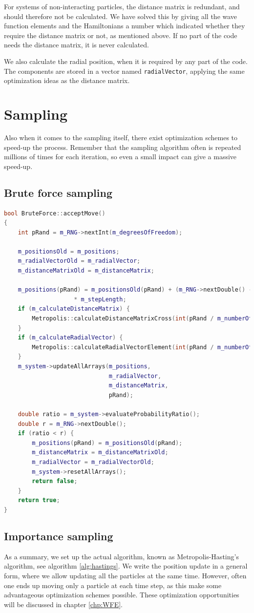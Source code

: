For systems of non-interacting particles, the distance matrix is redundant, and should therefore not be calculated. We have solved this by giving all the wave function elements and the Hamiltonians a number which indicated whether they require the distance matrix or not, as mentioned above. If no part of the code needs the distance matrix, it is never calculated. 

We also calculate the radial position, when it is required by any part of the code. The components are stored in a vector named \lstinline{radialVector}, applying the same optimization ideas as the distance matrix. 

\section{Sampling} \label{sec:sampling}
Also when it comes to the sampling itself, there exist optimization schemes to speed-up the process. Remember that the sampling algorithm often is repeated millions of times for each iteration, so even a small impact can give a massive speed-up. 
\subsection{Brute force sampling}
\begin{lstlisting}[language=c++,caption={Taken from \lstinline{bruteforce.cpp}.}]
bool BruteForce::acceptMove()
{
	int pRand = m_RNG->nextInt(m_degreesOfFreedom);

	m_positionsOld = m_positions;
	m_radialVectorOld = m_radialVector;
	m_distanceMatrixOld = m_distanceMatrix;

	m_positions(pRand) = m_positionsOld(pRand) + (m_RNG->nextDouble() - 0.5)
					* m_stepLength;
	if (m_calculateDistanceMatrix) {
		Metropolis::calculateDistanceMatrixCross(int(pRand / m_numberOfDimensions));
	}
	if (m_calculateRadialVector) {
		Metropolis::calculateRadialVectorElement(int(pRand / m_numberOfDimensions));
	}
	m_system->updateAllArrays(m_positions,
	 						  m_radialVector,
	 						  m_distanceMatrix, 
	 						  pRand);

	double ratio = m_system->evaluateProbabilityRatio();
	double r = m_RNG->nextDouble();
	if (ratio < r) {
		m_positions(pRand) = m_positionsOld(pRand);
		m_distanceMatrix = m_distanceMatrixOld;
		m_radialVector = m_radialVectorOld;
		m_system->resetAllArrays();
		return false;
	}
	return true;
}
\end{lstlisting}

\subsection{Importance sampling}
As a summary, we set up the actual algorithm, known as Metropolis-Hasting's algorithm, see algorithm \eqref{alg:hastings}. We write the position update in a general form, where we allow updating all the particles at the same time. However, often one ends up moving only a particle at each time step, as this make some advantageous optimization schemes possible. These optimization opportunities will be discussed in chapter \ref{chp:WFE}.

